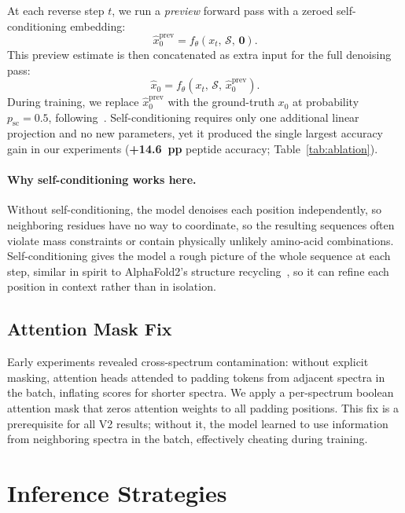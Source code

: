 \documentclass[10pt,twocolumn]{article}
\newcommand{\vect}[1]{\mathbf{#1}}
\begin{document}
At each reverse step $t$, we run a \emph{preview} forward pass with a zeroed self-conditioning embedding:
\begin{equation}
  \hat{x}_0^{\text{prev}} = f_\theta\!\left(x_t,\, \mathcal{S},\, \vect{0}\right).
\end{equation}
This preview estimate is then concatenated as extra input for the full denoising pass:
\begin{equation}
  \hat{x}_0 = f_\theta\!\left(x_t,\, \mathcal{S},\, \hat{x}_0^{\text{prev}}\right).
  \label{eq:selfcond}
\end{equation}
During training, we replace $\hat{x}_0^{\text{prev}}$ with the ground-truth $x_0$ at probability
$p_{\text{sc}} = 0.5$, following~\citet{chen2022analog}.
Self-conditioning requires only one additional linear projection and no new parameters, yet it
produced the single largest accuracy gain in our experiments
(\textbf{+14.6~pp} peptide accuracy; Table~\ref{tab:ablation}).

\paragraph{Why self-conditioning works here.}
Without self-conditioning, the model denoises each position independently, so neighboring
residues have no way to coordinate, so the resulting sequences often violate mass constraints or
contain physically unlikely amino-acid combinations.
Self-conditioning gives the model a rough picture of the whole sequence at each step, similar
in spirit to AlphaFold2's structure recycling~\citep{jumper2021highly}, so it can refine each
position in context rather than in isolation.

\subsection{Attention Mask Fix}

Early experiments revealed cross-spectrum contamination: without explicit masking, attention
heads attended to padding tokens from adjacent spectra in the batch, inflating scores for
shorter spectra.
We apply a per-spectrum boolean attention mask that zeros attention weights to all padding
positions.
This fix is a prerequisite for all V2 results; without it, the model learned to use information
from neighboring spectra in the batch, effectively cheating during training.

\section{Inference Strategies}
\label{sec:inference}
\end{document}
